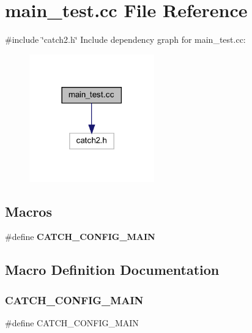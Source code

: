 \section{main\+\_\+test.\+cc File Reference}
\label{main__test_8cc}
{\ttfamily \#include \char`\"{}catch2.\+h\char`\"{}}\newline
Include dependency graph for main\+\_\+test.\+cc\+:
\nopagebreak
\begin{figure}[H]
\begin{center}
\leavevmode
\includegraphics[width=153pt]{main__test_8cc__incl}
\end{center}
\end{figure}
\subsection*{Macros}
\begin{DoxyCompactItemize}
\item 
\#define \textbf{ C\+A\+T\+C\+H\+\_\+\+C\+O\+N\+F\+I\+G\+\_\+\+M\+A\+IN}
\end{DoxyCompactItemize}


\subsection{Macro Definition Documentation}
\mbox{\label{main__test_8cc_a656eb5868e824d59f489f910db438420}} 
\subsubsection{CATCH\_CONFIG\_MAIN}
{\footnotesize\ttfamily \#define C\+A\+T\+C\+H\+\_\+\+C\+O\+N\+F\+I\+G\+\_\+\+M\+A\+IN}

